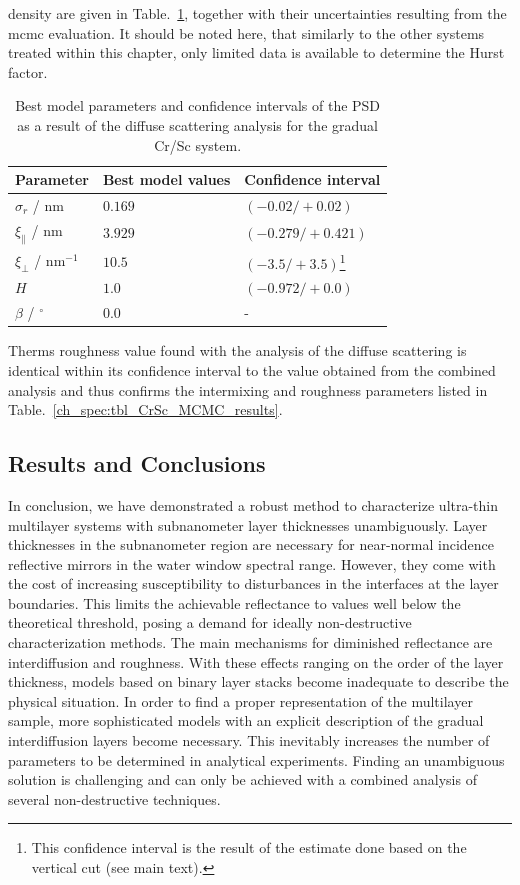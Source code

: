 density are given in Table.~\ref{ch_diff:tbl_CrSc_psd_results}, together with their 
uncertainties resulting from the \gls{mcmc} evaluation. It should be noted here, that similarly to the other systems treated within this chapter, only limited data is available to determine the Hurst factor.
\begin{table}
\centering
\caption{Best model parameters and confidence intervals of the PSD as a result of the diffuse scattering analysis for the gradual Cr/Sc system.}
\label{ch_diff:tbl_CrSc_psd_results}
\begin{tabular}{@{}lll@{}}
\toprule
Parameter & Best model values & Confidence interval\\ \midrule
$\sigma_r$ / nm & $0.169  $&$(-0.02/+0.02)$ \\
$\xi_\parallel$ / nm& $3.929 $&$(-0.279 / +0.421)$ \\
$\xi_\perp$  / nm$^{-1}$& $10.5 $&$ (-3.5/+3.5)$\footnote{This confidence interval is the result of the estimate done based on the vertical cut (see main text).} \\
$H$ & $1.0$ & $(-0.972 /+0.0)$ \\
$\beta$ / $^\circ$ & $0.0$ & - \\
 \bottomrule
\end{tabular}
\end{table}
The\gls{rms} roughness value found with the analysis of the diffuse scattering is 
identical within its confidence interval to the value obtained from the 
combined analysis and thus confirms the intermixing and roughness parameters 
listed in Table.~\ref{ch_spec:tbl_CrSc_MCMC_results}.


\subsection{Results and Conclusions}
In conclusion, we have demonstrated a robust method to characterize ultra-thin 
multilayer systems with subnanometer layer thicknesses unambiguously. Layer 
thicknesses in the subnanometer region are necessary for near-normal incidence 
reflective mirrors in the water window spectral range. However, they come with 
the cost of increasing susceptibility to disturbances in the interfaces at the 
layer boundaries. This limits the achievable reflectance to values well below 
the theoretical threshold, posing a demand for ideally non-destructive 
characterization methods. The main mechanisms for diminished reflectance are 
interdiffusion and roughness. With these effects ranging on the order of the 
layer thickness, models based on binary layer stacks become inadequate to 
describe the physical situation. In order to find a proper representation of 
the multilayer sample, more sophisticated models with an explicit description 
of the gradual interdiffusion layers become necessary. This inevitably 
increases the number of parameters to be determined in analytical experiments. 
Finding an unambiguous solution is challenging and can only be achieved with a 
combined analysis of several non-destructive techniques.

